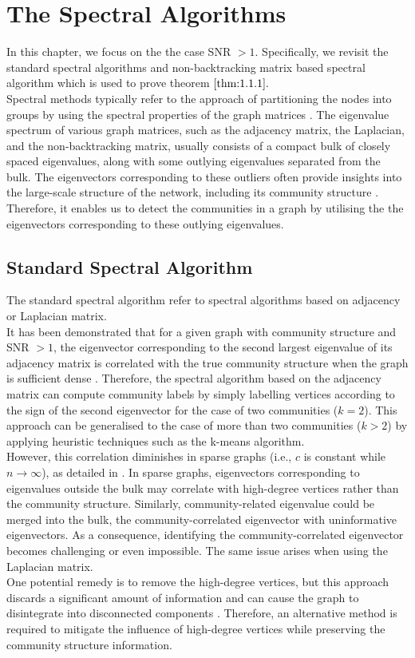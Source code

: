 \chapter{The Spectral Algorithms}\label{chapter:2}
In this chapter, we focus on the the case SNR $>1.$ Specifically, we revisit the standard spectral algorithms and non-backtracking matrix based spectral algorithm which is used to prove theorem $\ref{thm:1.1.1}.$\\
Spectral methods typically refer to the approach of partitioning the nodes into groups by using the  spectral properties of the graph matrices \cite{dallamico:tel-03454227}. The eigenvalue spectrum of various graph matrices, such as the adjacency matrix, the Laplacian, and the non-backtracking matrix, usually consists of a compact bulk of closely spaced eigenvalues, along with some outlying eigenvalues separated from the bulk. The eigenvectors corresponding to these outliers often  provide insights into the large-scale structure of the network, including its community structure \cite{userguide}. Therefore, it enables us to detect the communities in  a graph by utilising the the eigenvectors corresponding to these outlying eigenvalues.
\section{Standard Spectral Algorithm}
The standard spectral algorithm refer to spectral algorithms based on adjacency or Laplacian matrix. \\
It has been demonstrated that for a given graph with community structure and SNR $>1$, the eigenvector corresponding to the second largest eigenvalue of its adjacency matrix is correlated with the true community structure when the graph is sufficient dense \cite{standard_spec_in_dense}. Therefore, the spectral algorithm based on the adjacency matrix can compute community labels by simply labelling vertices according to the sign of the second eigenvector for the case of two communities ($k=2$). This approach can be generalised to the case of more than two communities ($k>2$) by applying heuristic techniques such as the k-means algorithm.\\
However, this correlation diminishes in sparse graphs (i.e., $c$ is constant while $n\to\infty$), as detailed in \cite{the_non-backtracking}. In sparse graphs, eigenvectors corresponding to eigenvalues outside the bulk may correlate with high-degree vertices rather than the community structure. Similarly, community-related eigenvalue could be merged into the bulk, the community-correlated eigenvector with uninformative eigenvectors. As a consequence, identifying the community-correlated eigenvector becomes challenging or even impossible. The same issue arises when using the Laplacian matrix.\\
One potential remedy is to remove the high-degree vertices, but this approach discards a significant amount of information and can cause the graph to disintegrate into disconnected components \cite{TheConjecture}. Therefore, an alternative method is required to mitigate the influence of high-degree vertices while preserving the community structure information.

